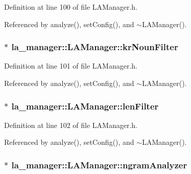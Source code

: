 Definition at line 100 of file LAManager.h.

Referenced by analyze(), setConfig(), and $\sim$LAManager().\hypertarget{classla__manager_1_1LAManager_4ce35eb40c9be46b85c583f0be9c06f0}{
\subsubsection[{krNounFilter}]{$\ast$ {\bf la\_\-manager::LAManager::krNounFilter}}}
\label{classla__manager_1_1LAManager_4ce35eb40c9be46b85c583f0be9c06f0}




Definition at line 101 of file LAManager.h.

Referenced by analyze(), setConfig(), and $\sim$LAManager().\hypertarget{classla__manager_1_1LAManager_937ffbd6637ceb994e7446adffbff8d1}{
\subsubsection[{lenFilter}]{$\ast$ {\bf la\_\-manager::LAManager::lenFilter}}}
\label{classla__manager_1_1LAManager_937ffbd6637ceb994e7446adffbff8d1}




Definition at line 102 of file LAManager.h.

Referenced by analyze(), setConfig(), and $\sim$LAManager().\hypertarget{classla__manager_1_1LAManager_b3cdad6370589405b9d57deeb457e2f8}{
\subsubsection[{ngramAnalyzer}]{$\ast$ {\bf la\_\-manager::LAManager::ngramAnalyzer}}}
\label{classla__manager_1_1LAManager_b3cdad6370589405b9d57deeb457e2f8}





